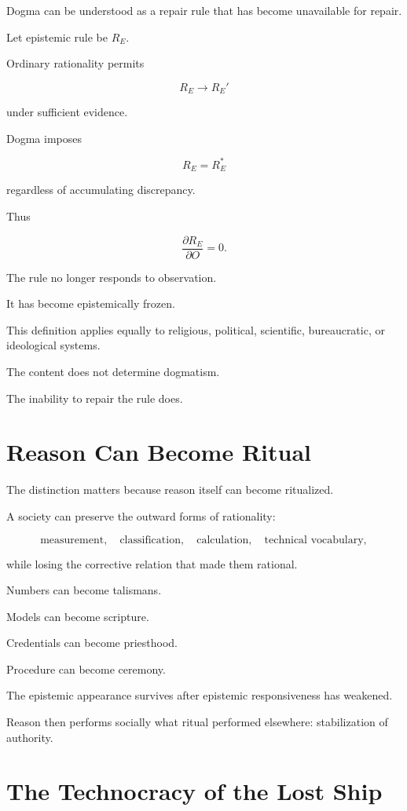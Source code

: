 \documentclass[11pt,oneside]{book}
\theoremstyle{definition}
\theoremstyle{remark}
\begin{document}
Dogma can be understood as a repair rule that has become unavailable for repair.

Let epistemic rule be \(R_E\).

Ordinary rationality permits

\[
R_E\rightarrow R_E'
\]

under sufficient evidence.

Dogma imposes

\[
R_E=R_E^\ast
\]

regardless of accumulating discrepancy.

Thus

\[
\frac{\partial R_E}{\partial O}=0.
\]

The rule no longer responds to observation.

It has become epistemically frozen.

This definition applies equally to religious, political, scientific, bureaucratic, or ideological systems.

The content does not determine dogmatism.

The inability to repair the rule does.

\section{Reason Can Become Ritual}

The distinction matters because reason itself can become ritualized.

A society can preserve the outward forms of rationality:

\[
\text{measurement},
\quad
\text{classification},
\quad
\text{calculation},
\quad
\text{technical vocabulary},
\]

while losing the corrective relation that made them rational.

Numbers can become talismans.

Models can become scripture.

Credentials can become priesthood.

Procedure can become ceremony.

The epistemic appearance survives after epistemic responsiveness has weakened.

Reason then performs socially what ritual performed elsewhere: stabilization of authority.

\section{The Technocracy of the Lost Ship}
\end{document}
